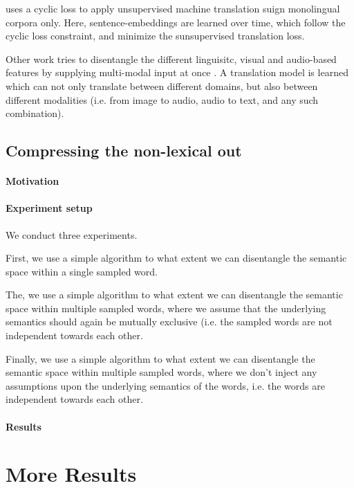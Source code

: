 \documentclass[a4paper,12pt,oneside,openright]{report}
\begin{document}
\cite{lample18} uses a cyclic loss to apply unsupervised machine translation suign monolingual corpora only. 
Here, sentence-embeddings are learned over time, which follow the cyclic loss constraint, and minimize the sunsupervised translation loss.

Other work tries to disentangle the different linguisitc, visual and audio-based features by supplying multi-modal input at once \cite{ma19}.
A translation model is learned which can not only translate between different domains, but also between different modalities (i.e. from image to audio, audio to text, and any such combination).


\section{Compressing the non-lexical out}

\subsubsection{Motivation}
\subsubsection{Experiment setup}

We conduct three experiments.

First, we use a simple algorithm to what extent we can disentangle the semantic space within a single sampled word.

The, we use a simple algorithm to what extent we can disentangle the semantic space within multiple sampled words, where we assume that the underlying semantics should again be mutually exclusive (i.e. the sampled words are not independent towards each other.

Finally, we use a simple algorithm to what extent we can disentangle the semantic space within multiple sampled words, where we don't inject any assumptions upon the underlying semantics of the words, i.e. the words are independent towards each other.


\subsubsection{Results}


\chapter{More Results}
\end{document}
